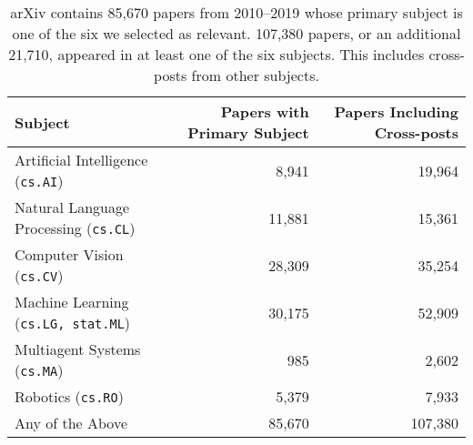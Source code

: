 
\begin{table}[h]
\centering
\caption{arXiv contains 85,670 papers from 2010–2019 whose primary subject is one of the six we selected as
      relevant. 107,380 papers, or an additional 21,710, appeared in at least one of the six
      subjects. This includes cross-posts from other subjects.}
\begin{tabular}{lrr}
\toprule
Subject & Papers with Primary Subject & Papers Including Cross-posts \\
\midrule
  Artificial Intelligence (\texttt{cs.AI}) &                       8,941 &                       19,964 \\
  Natural Language Processing (\texttt{cs.CL}) &                      11,881 &                       15,361 \\
  Computer Vision (\texttt{cs.CV}) &                      28,309 &                       35,254 \\
  Machine Learning (\texttt{cs.LG, stat.ML}) &                      30,175 &                       52,909 \\
  Multiagent Systems (\texttt{cs.MA}) &                         985 &                        2,602 \\
  Robotics (\texttt{cs.RO}) &                       5,379 &                        7,933 \\
 \midrule
Any of the Above &                      85,670 &                      107,380 \\
\bottomrule
\end{tabular}

\label{tab:subject-counts}
\end{table}
